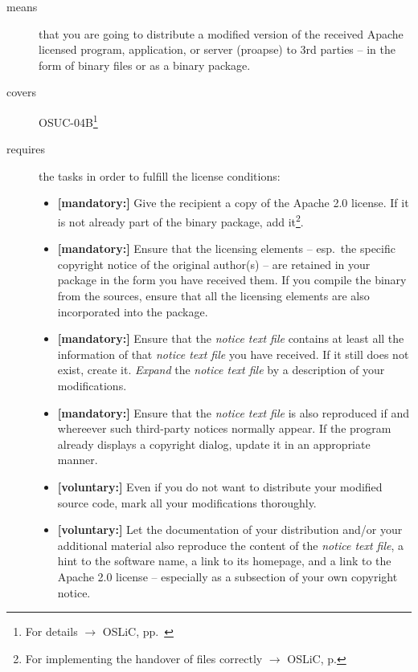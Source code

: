 \begin{description}
\item[means] that you are going to distribute a modified version of the received
Apache licensed pro\-gram, application, or server (proapse) to 3rd parties -- in
the form of binary files or as a binary package.
\item[covers] OSUC-04B\footnote{For details $\rightarrow$ OSLiC, pp.\
\pageref{OSUC-04B-DEF}}
\item[requires] the tasks in order to fulfill the license conditions:
\begin{itemize}

 \item \textbf{[mandatory:]} Give the recipient a copy of the Apache 2.0
  license. If it is not already part of the binary package, add
  it\footnote{For implementing the handover of files correctly $\rightarrow$
  OSLiC, p. \pageref{DistributingFilesHint}}.
  
  \item \textbf{[mandatory:]} Ensure that the licensing elements -- esp.\ the
  specific copyright notice of the original author(s) -- are retained in your
  package in the form you have received them. If you compile the binary from the
  sources, ensure that all the licensing elements are also incorporated into the
  package.
  
  \item \textbf{[mandatory:]} Ensure that the \emph{notice text file} contains
  at least all the information of that \emph{notice text file} you have
  received. If it still does not exist, create it. \emph{Expand} the
  \emph{notice text file} by a description of your modifications.
  
  \item \textbf{[mandatory:]} Ensure that the \emph{notice text file} is also
  reproduced if and whereever such third-party notices normally appear. If the
  program already displays a copyright dialog, update it in an appropriate
  manner.
 
  \item \textbf{[voluntary:]} Even if you do not want to distribute your
  modified source code, mark all your modifications thoroughly.
 
  \item \textbf{[voluntary:]} Let the documentation of your distribution and/or
  your additional material also reproduce the content of the \emph{notice text
  file}, a hint to the software name, a link to its homepage, and a link to the
  Apache 2.0 license -- especially as a subsection of your own copyright notice.


\end{itemize}
\end{description}
